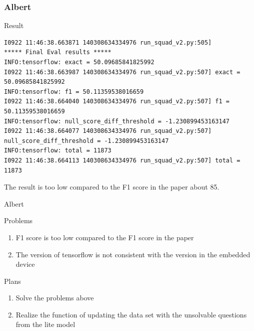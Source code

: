 \documentclass[12pt]{beamer}
\begin{document}
\begin{frame}[fragile]
\frametitle{Albert}
    \begin{block}{Result}
    \tiny
    \begin{lstlisting}
I0922 11:46:38.663871 140308634334976 run_squad_v2.py:505]
***** Final Eval results *****
INFO:tensorflow: exact = 50.09685841825992
I0922 11:46:38.663987 140308634334976 run_squad_v2.py:507] exact = 50.09685841825992
INFO:tensorflow: f1 = 50.11359538016659
I0922 11:46:38.664040 140308634334976 run_squad_v2.py:507] f1 = 50.11359538016659
INFO:tensorflow: null_score_diff_threshold = -1.230899453163147
I0922 11:46:38.664077 140308634334976 run_squad_v2.py:507]
null_score_diff_threshold = -1.230899453163147
INFO:tensorflow: total = 11873
I0922 11:46:38.664113 140308634334976 run_squad_v2.py:507] total = 11873
    \end{lstlisting}
    \end{block}
    The result is too low compared to the F1 score in the paper about 85.
\end{frame}

\begin{frame}{Albert}
    \begin{block}{Problems}
    \begin{enumerate}
        \item F1 score is too low compared to the F1 score in the paper
        \item The version of tensorflow is not consistent with the version in the embedded device
    \end{enumerate}
    \end{block}
    
    \begin{block}{Plans}
    \begin{enumerate}
        \item Solve the problems above
        \item Realize the function of updating the data set with the unsolvable questions from the lite model
    \end{enumerate}
    \end{block}
\end{frame}
\end{document}
